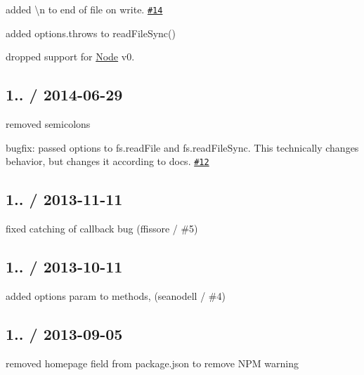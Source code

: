 \begin{DoxyItemize}
\item added {\ttfamily \textbackslash{}n} to end of file on write. \href{https://github.com/jprichardson/node-jsonfile/pull/14}{\tt \#14}
\item added {\ttfamily options.\+throws} to {\ttfamily read\+File\+Sync()}
\item dropped support for \mbox{\hyperlink{classNode}{Node}} v0.
\end{DoxyItemize}

\subsection*{1.. / 2014-\/06-\/29 }


\begin{DoxyItemize}
\item removed semicolons
\item bugfix\+: passed {\ttfamily options} to {\ttfamily fs.\+read\+File} and {\ttfamily fs.\+read\+File\+Sync}. This technically changes behavior, but changes it according to docs. \href{https://github.com/jprichardson/node-jsonfile/issues/12}{\tt \#12}
\end{DoxyItemize}

\subsection*{1.. / 2013-\/11-\/11 }


\begin{DoxyItemize}
\item fixed catching of callback bug (ffissore / \#5)
\end{DoxyItemize}

\subsection*{1.. / 2013-\/10-\/11 }


\begin{DoxyItemize}
\item added {\ttfamily options} param to methods, (seanodell / \#4)
\end{DoxyItemize}

\subsection*{1.. / 2013-\/09-\/05 }


\begin{DoxyItemize}
\item removed {\ttfamily homepage} field from package.\+json to remove N\+PM warning
\end{DoxyItemize}

